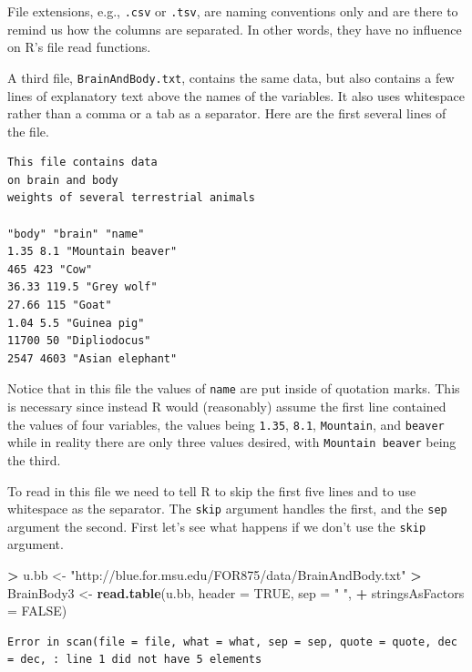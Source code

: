 \documentclass[]{krantz}
\makeatletter
\newenvironment{Shaded}{\begin{snugshade}}{\end{snugshade}}
\newcommand{\KeywordTok}[1]{\textcolor[rgb]{0.27,0.27,0.27}{\textbf{#1}}}
\newcommand{\DataTypeTok}[1]{\textcolor[rgb]{0.27,0.27,0.27}{#1}}
\newcommand{\StringTok}[1]{\textcolor[rgb]{0.5,0.5,0.5}{#1}}
\newcommand{\OtherTok}[1]{\textcolor[rgb]{0.37,0.37,0.37}{#1}}
\newcommand{\OperatorTok}[1]{\textcolor[rgb]{0.43,0.43,0.43}{\textbf{#1}}}
\newcommand{\NormalTok}[1]{#1}
\newenvironment{kframe}{%
\medskip{}
\setlength{\fboxsep}{.8em}
 \def\at@end@of@kframe{}%
 \ifinner\ifhmode%
  \def\at@end@of@kframe{\end{minipage}}%
  \begin{minipage}{\columnwidth}%
 \fi\fi%
 \def\FrameCommand##1{\hskip\@totalleftmargin \hskip-\fboxsep
 \colorbox{shadecolor}{##1}\hskip-\fboxsep
     \hskip-\linewidth \hskip-\@totalleftmargin \hskip\columnwidth}%
 \MakeFramed {\advance\hsize-\width
   \@totalleftmargin\z@ \linewidth\hsize
   \@setminipage}}%
 {\par\unskip\endMakeFramed%
 \at@end@of@kframe}
\renewenvironment{Shaded}{\begin{kframe}}{\end{kframe}}
\makeatother
\begin{document}
File extensions, e.g., \texttt{.csv} or \texttt{.tsv}, are naming
conventions only and are there to remind us how the columns are
separated. In other words, they have no influence on R's file read
functions.

A third file, \texttt{BrainAndBody.txt}, contains the same data, but
also contains a few lines of explanatory text above the names of the
variables. It also uses whitespace rather than a comma or a tab as a
separator. Here are the first several lines of the file.

\begin{verbatim}
This file contains data
on brain and body
weights of several terrestrial animals

"body" "brain" "name"
1.35 8.1 "Mountain beaver"
465 423 "Cow"
36.33 119.5 "Grey wolf"
27.66 115 "Goat"
1.04 5.5 "Guinea pig"
11700 50 "Dipliodocus"
2547 4603 "Asian elephant"
\end{verbatim}

Notice that in this file the values of \texttt{name} are put inside of
quotation marks. This is necessary since instead R would (reasonably)
assume the first line contained the values of four variables, the values
being \texttt{1.35}, \texttt{8.1}, \texttt{Mountain}, and
\texttt{beaver} while in reality there are only three values desired,
with \texttt{Mountain\ beaver} being the third.

To read in this file we need to tell R to skip the first five lines and
to use whitespace as the separator. The \texttt{skip} argument handles
the first, and the \texttt{sep} argument the second. First let's see
what happens if we don't use the \texttt{skip} argument.

\begin{Shaded}
\begin{Highlighting}[]
\OperatorTok{>}\StringTok{ }\NormalTok{u.bb <-}\StringTok{ "http://blue.for.msu.edu/FOR875/data/BrainAndBody.txt"}
\OperatorTok{>}\StringTok{ }\NormalTok{BrainBody3 <-}\StringTok{ }\KeywordTok{read.table}\NormalTok{(u.bb, }\DataTypeTok{header =} \OtherTok{TRUE}\NormalTok{, }\DataTypeTok{sep =} \StringTok{" "}\NormalTok{, }
\OperatorTok{+}\StringTok{                          }\DataTypeTok{stringsAsFactors =} \OtherTok{FALSE}\NormalTok{)}
\end{Highlighting}
\end{Shaded}

\begin{verbatim}
Error in scan(file = file, what = what, sep = sep, quote = quote, dec = dec, : line 1 did not have 5 elements
\end{verbatim}
\end{document}
